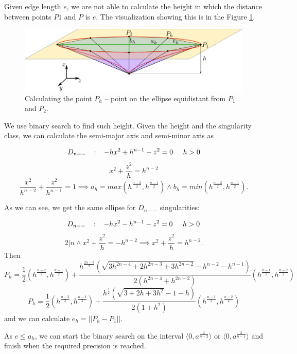 Given edge length $e$, we are not able to calculate the height in which the distance
between points $P1$ and $P$ is $e$. The visualization showing this is in the Figure \ref{img:17}.

\begin{figure}
    \centerline{\includegraphics[scale=0.5]{images/img17}}
    \caption[Calculating the point $P_h$]
    {Calculating the point $P_h$ -- point on the ellipse equidistant from $P_1$ and $P_2$.}
    \label{img:17}
\end{figure}

We use binary search to find such height.
Given the height and the singularity class, we can calculate the semi-major axis
and semi-minor axis as 

$$D_{n+-} \hspace{3mm} :\hspace{3mm}  -hx^2+h^{n-1}-z^2 = 0 \hspace{5mm} h>0$$
$$x^2 + \frac{z^2}{h} = h^{n-2}$$
$$\frac{x^2}{h^{n-2}} + \frac{z^2}{h^{n-1}} = 1 \implies a_h=max(h^\frac{n-2}{2}, h^\frac{n-1}{2}) \land b_h=min(h^\frac{n-2}{2}, h^\frac{n-1}{2}).$$

As we can see, we get the same ellipse for $D_{n--}$ singularities:

$$D_{n--} \hspace{3mm} :\hspace{3mm}  -hx^2-h^{n-1}-z^2 = 0 \hspace{5mm} h>0$$
$$2|n \land x^2 + \frac{z^2}{h} = -h^{n-2} \implies x^2 + \frac{z^2}{h} = h^{n-2}.$$
Then 
$$P_h=\frac{1}{2}(h^\frac{n-2}{2},h^\frac{n-1}{2}) + \frac{h^\frac{2n-3}{2}(\sqrt{3h^{2n-4}+2h^{2n-3}+3h^{2n-2}}-h^{n-2}-h^{n-1})}{2(h^{2n-4}+h^{2n-2})}(h^\frac{n-1}{2},h^\frac{n-2}{2})$$
$$P_h=\frac{1}{2}(h^\frac{n-2}{2},h^\frac{n-1}{2}) + \frac{h^\frac{1}{2}(\sqrt{3+2h+3h^2}-1-h)}{2(1+h^2)}(h^\frac{n-1}{2},h^\frac{n-2}{2})$$
and we can calculate $e_h=||P_h-P_1||$.

As $e \leq a_h$, we can start the binary search on the interval
$\langle 0, a^\frac{2}{n-2}\rangle$ or $\langle 0, a^\frac{2}{n-1}\rangle$
and finish when the required precision is reached.

